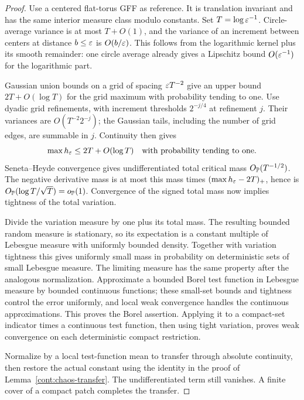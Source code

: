 \begin{proof}
Use a centered flat-torus GFF as reference.  It is translation invariant
and has the same interior measure class modulo constants.  Set
$T=\log\varepsilon^{-1}$.  Circle-average variance is at most $T+O(1)$, and the
variance of an increment between centers at distance $b\leq\varepsilon$ is
$O(b/\varepsilon)$.  This follows from the logarithmic kernel plus its smooth
remainder: one circle average already gives a Lipschitz bound
$O(\varepsilon^{-1})$ for the logarithmic part.

Gaussian union bounds on a grid of spacing $\varepsilon T^{-2}$ give an upper
bound $2T+O(\log T)$ for the grid maximum with probability tending to one.
Use dyadic grid refinements, with increment thresholds $2^{-j/4}$ at
refinement $j$.  Their variances are $O(T^{-2}2^{-j})$; the Gaussian tails,
including the number of grid edges, are summable in $j$.  Continuity then
gives
\[
 \max h_\varepsilon\leq2T+O(\log T)
 \quad\hbox{with probability tending to one}.
\]
Seneta--Heyde convergence gives undifferentiated total critical mass
$O_{\mathbb P}(T^{-1/2})$.  The negative derivative mass is at most this mass
times $(\max h_\varepsilon-2T)_+$, hence is
$O_{\mathbb P}(\log T/\sqrt T)=o_{\mathbb P}(1)$.  Convergence of the signed total
mass now implies tightness of the total variation.

Divide the variation measure by one plus its total mass.  The resulting
bounded random measure is stationary, so its expectation is a constant
multiple of Lebesgue measure with uniformly bounded density.  Together with
variation tightness this gives uniformly small mass in probability on
deterministic sets of small Lebesgue measure.  The limiting measure has the
same property after the analogous normalization.  Approximate a bounded
Borel test function in Lebesgue measure by bounded continuous functions;
these small-set bounds and tightness control the error uniformly, and local
weak convergence handles the continuous approximations.  This proves the
Borel assertion.  Applying it to a compact-set indicator times a
continuous test function, then using tight variation, proves weak
convergence on each deterministic compact restriction.

Normalize by a local test-function mean to transfer through absolute
continuity, then restore the actual constant using the identity in the
proof of Lemma~\ref{cont:chaos-transfer}.  The undifferentiated term still
vanishes.  A finite cover of a compact patch completes the transfer.
\end{proof}


